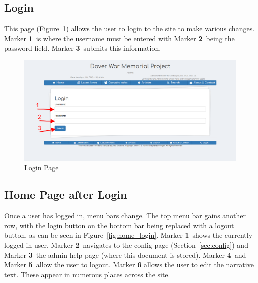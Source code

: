 \documentclass[12pt]{article}
\newcommand{\marker}[1]{Marker \color{red}\textbf{#1}\color{black}}
\begin{document}
\FloatBarrier
\subsection{Login}\label{ssec:login}
This page (Figure~\ref{fig:login}) allows the user to login to the site to make various changes. \marker{1}\ is where the username must be entered with \marker{2}\ being the password field. \marker{3}\ submits this information.

\begin{figure}[h]
  \centering
 \includegraphics[width=\textwidth]{pics/login.png}
	\caption{Login Page}\label{fig:login}
\end{figure}

\FloatBarrier
\subsection{Home Page after Login}
Once a user has logged in, menu bars change. The top menu bar gains another row, with the login button on the bottom bar being replaced with a logout button, as can be seen in Figure~\ref{fig:home_login}. \marker{1}\ shows the currently logged in user, \marker{2}\ navigates to the config page (Section~\ref{sec:config}) and \marker{3}\ the admin help page (where this document is stored). \marker{4}\ and \marker{5}\ allow the user to logout. \marker{6} allows the user to edit the narrative text. These appear in numerous places across the site.
\end{document}
